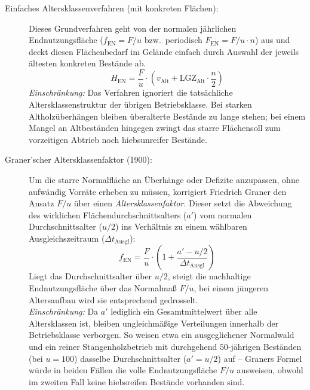 \documentclass[twocolumn, paper=a4, fontsize=10pt]{scrartcl}
\begin{document}
\begin{description}
\item[Einfaches Altersklassenverfahren (mit konkreten Flächen):] Dieses Grundverfahren geht von der normalen jährlichen Endnutzungsfläche ($f_{\text{EN}} = F/u$ bzw.\ periodisch $F_{\text{EN}} = F/u \cdot n$) aus und deckt diesen Flächenbedarf im Gelände einfach durch Auswahl der jeweils ältesten konkreten Bestände ab. 
\begin{equation}
H_{\text{EN}} = \frac{F}{u} \cdot \left( v_{\text{Alt}} + \text{LGZ}_{\text{Alt}} \cdot \frac{n}{2} \right)
\end{equation}
\emph{Einschränkung:} Das Verfahren ignoriert die tatsächliche Altersklassenstruktur der übrigen Betriebsklasse. Bei starken Altholzüberhängen bleiben überalterte Bestände zu lange stehen; bei einem Mangel an Altbeständen hingegen zwingt das starre Flächensoll zum vorzeitigen Abtrieb noch hiebsunreifer Bestände.

\item[Graner'scher Altersklassenfaktor (1900):] Um die starre Normalfläche an Überhänge oder Defizite anzupassen, ohne aufwändig Vorräte erheben zu müssen, korrigiert Friedrich Graner den Ansatz $F/u$ über einen \emph{Altersklassenfaktor}. Dieser setzt die Abweichung des wirklichen Flächendurchschnittsalters ($a'$) vom normalen Durchschnittsalter ($u/2$) ins Verhältnis zu einem wählbaren Ausgleichszeitraum ($\Delta t_{\text{Ausgl}}$):
\begin{equation}
f_{\text{EN}} = \frac{F}{u} \cdot \left( 1 + \frac{a' - u/2}{\Delta t_{\text{Ausgl}}} \right)
\end{equation}
Liegt das Durchschnittsalter über $u/2$, steigt die nachhaltige Endnutzungsfläche über das Normalmaß $F/u$, bei einem jüngeren Altersaufbau wird sie entsprechend gedrosselt. \\
\emph{Einschränkung:} Da $a'$ lediglich ein Gesamtmittelwert über alle Altersklassen ist, bleiben ungleichmäßige Verteilungen innerhalb der Betriebsklasse verborgen. So weisen etwa ein ausgeglichener Normalwald und ein reiner Stangenholzbetrieb mit durchgehend $50$-jährigen Beständen (bei $u = 100$) dasselbe Durchschnittsalter ($a' = u/2$) auf -- Graners Formel würde in beiden Fällen die volle Endnutzungsfläche $F/u$ ausweisen, obwohl im zweiten Fall keine hiebsreifen Bestände vorhanden sind.


\end{description}
\end{document}
